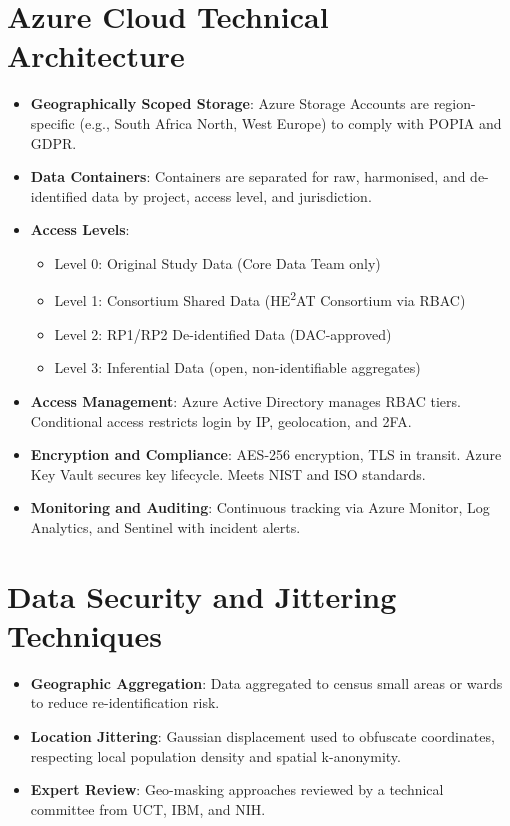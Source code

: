\documentclass{article}
\begin{document}
\section*{Azure Cloud Technical Architecture}
\begin{itemize}
    \item \textbf{Geographically Scoped Storage}: Azure Storage Accounts are region-specific (e.g., South Africa North, West Europe) to comply with POPIA and GDPR.
    \item \textbf{Data Containers}: Containers are separated for raw, harmonised, and de-identified data by project, access level, and jurisdiction.
    \item \textbf{Access Levels}:
    \begin{itemize}
        \item Level 0: Original Study Data (Core Data Team only)
        \item Level 1: Consortium Shared Data (HE\textsuperscript{2}AT Consortium via RBAC)
        \item Level 2: RP1/RP2 De-identified Data (DAC-approved)
        \item Level 3: Inferential Data (open, non-identifiable aggregates)
    \end{itemize}
    \item \textbf{Access Management}: Azure Active Directory manages RBAC tiers. Conditional access restricts login by IP, geolocation, and 2FA.
    \item \textbf{Encryption and Compliance}: AES-256 encryption, TLS in transit. Azure Key Vault secures key lifecycle. Meets NIST and ISO standards.
    \item \textbf{Monitoring and Auditing}: Continuous tracking via Azure Monitor, Log Analytics, and Sentinel with incident alerts.
\end{itemize}

\section*{Data Security and Jittering Techniques}
\begin{itemize}
    \item \textbf{Geographic Aggregation}: Data aggregated to census small areas or wards to reduce re-identification risk.
    \item \textbf{Location Jittering}: Gaussian displacement used to obfuscate coordinates, respecting local population density and spatial k-anonymity.
    \item \textbf{Expert Review}: Geo-masking approaches reviewed by a technical committee from UCT, IBM, and NIH.
\end{itemize}
\end{document}
